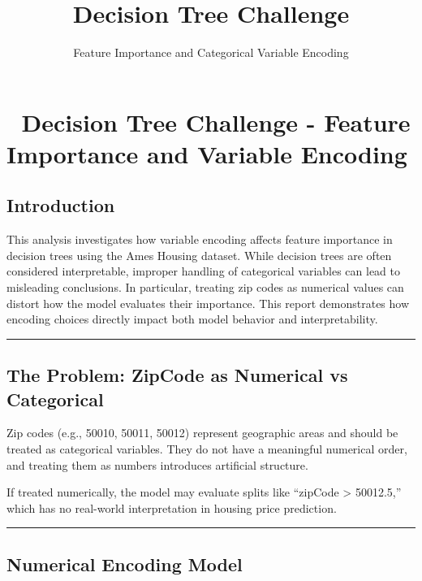 \documentclass[
  letterpaper,
  DIV=11,
  numbers=noendperiod]{scrartcl}
\title{Decision Tree Challenge}
\subtitle{Feature Importance and Categorical Variable Encoding}
\author{}
\date{}
\begin{document}
\maketitle


\section{🌳 Decision Tree Challenge - Feature Importance and Variable
Encoding}\label{decision-tree-challenge---feature-importance-and-variable-encoding}

\subsection{Introduction}\label{introduction}

This analysis investigates how variable encoding affects feature
importance in decision trees using the Ames Housing dataset. While
decision trees are often considered interpretable, improper handling of
categorical variables can lead to misleading conclusions. In particular,
treating zip codes as numerical values can distort how the model
evaluates their importance. This report demonstrates how encoding
choices directly impact both model behavior and interpretability.

\begin{center}\rule{0.5\linewidth}{0.5pt}\end{center}

\subsection{The Problem: ZipCode as Numerical vs
Categorical}\label{the-problem-zipcode-as-numerical-vs-categorical}

Zip codes (e.g., 50010, 50011, 50012) represent geographic areas and
should be treated as categorical variables. They do not have a
meaningful numerical order, and treating them as numbers introduces
artificial structure.

If treated numerically, the model may evaluate splits like ``zipCode
\textgreater{} 50012.5,'' which has no real-world interpretation in
housing price prediction.

\begin{center}\rule{0.5\linewidth}{0.5pt}\end{center}

\subsection{Numerical Encoding Model}\label{numerical-encoding-model}
\end{document}
